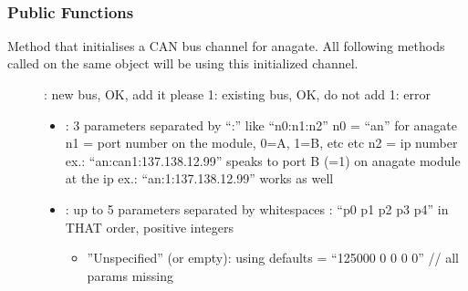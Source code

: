 \documentclass[a4paper,10pt,english]{sphinxmanual}
\begin{document}
\begin{fulllineitems}
\label{\detokenize{vendors/anagate:_CPPv410AnaCanScan}}%
\pysigstartmultiline
{}%
\pysigstopmultiline~\subsubsection*{Public Functions}

\begin{fulllineitems}
\label{\detokenize{vendors/anagate:_CPPv4N10AnaCanScan9createBusEK6stringK6string}}%
\pysigstartmultiline
{}%
\pysigstopmultiline
Method that initialises a CAN bus channel for anagate. All following methods called on the same object will be using this initialized channel.

\begin{description}
\item[{}] : new bus, OK, add it please 1: existing bus, OK, do not add \sphinxhyphen{}1: error 

\item[{}] \leavevmode\begin{itemize}
\item {} 
: 3 parameters separated by “:” like “n0:n1:n2” n0 = “an” for anagate n1 = port number on the module, 0=A, 1=B, etc etc n2 = ip number ex.: “an:can1:137.138.12.99” speaks to port B (=1) on anagate module at the ip ex.: “an:1:137.138.12.99” works as well

\item {} 
: up to 5 parameters separated by whitespaces : “p0 p1 p2 p3 p4” in THAT order, positive integers\begin{itemize}
\item {} 
”Unspecified” (or empty): using defaults = “125000 0 0 0 0” // all params missing


\end{itemize}
\end{itemize}
\end{description}
\end{fulllineitems}
\end{fulllineitems}
\end{document}
